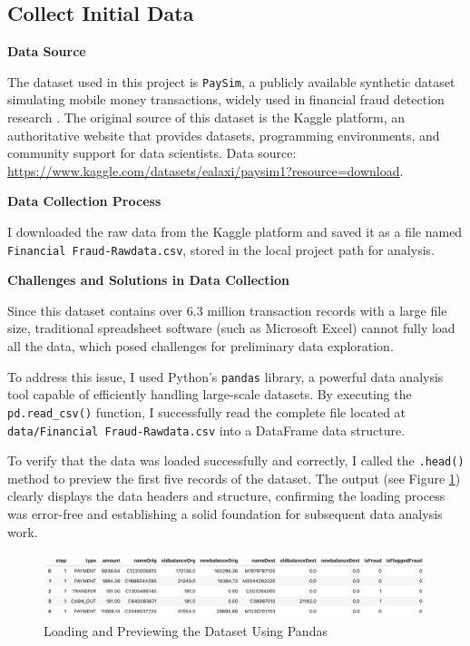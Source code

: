 \documentclass[sigplan,screen]{acmart}
\begin{document}
\subsection{Collect Initial Data}

\textbf{Data Source}

The dataset used in this project is \texttt{PaySim}, a publicly available synthetic dataset simulating mobile money transactions, widely used in financial fraud detection research \citep{paysim2016emss}. The original source of this dataset is the Kaggle platform, an authoritative website that provides datasets, programming environments, and community support for data scientists. Data source: \url{https://www.kaggle.com/datasets/ealaxi/paysim1?resource=download}.

\textbf{Data Collection Process}

I downloaded the raw data from the Kaggle platform and saved it as a file named \texttt{Financial Fraud-Rawdata.csv}, stored in the local project path for analysis.

\textbf{Challenges and Solutions in Data Collection}

Since this dataset contains over 6.3 million transaction records with a large file size, traditional spreadsheet software (such as Microsoft Excel) cannot fully load all the data, which posed challenges for preliminary data exploration.

To address this issue, I used Python's \texttt{pandas} library, a powerful data analysis tool capable of efficiently handling large-scale datasets. By executing the \texttt{pd.read\_csv()} function, I successfully read the complete file located at \texttt{data/Financial Fraud-Rawdata.csv} into a DataFrame data structure.

To verify that the data was loaded successfully and correctly, I called the \texttt{.head()} method to preview the first five records of the dataset. The output (see Figure \ref{fig:data_preview}) clearly displays the data headers and structure, confirming the loading process was error-free and establishing a solid foundation for subsequent data analysis work.

\begin{figure}[h!]
    \centering
    \includegraphics[width=0.9\columnwidth]{2.1.png}
    \caption{Loading and Previewing the Dataset Using Pandas}
    \label{fig:data_preview}
\end{figure}
\end{document}

